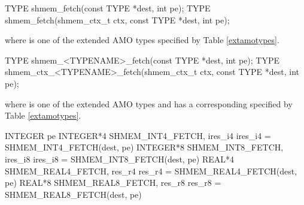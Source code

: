 
\begin{apidefinition}

\begin{C11synopsis}
TYPE shmem_fetch(const TYPE *dest, int pe);
TYPE shmem_fetch(shmem_ctx_t ctx, const TYPE *dest, int pe);
\end{C11synopsis}
where \TYPE{} is one of the extended \ac{AMO} types specified by Table \ref{extamotypes}.

\begin{Csynopsis}
TYPE shmem_<TYPENAME>_fetch(const TYPE *dest, int pe);
TYPE shmem_ctx_<TYPENAME>_fetch(shmem_ctx_t ctx, const TYPE *dest, int pe);
\end{Csynopsis}
where \TYPE{} is one of the extended \ac{AMO} types and has a corresponding \TYPENAME{} specified by Table \ref{extamotypes}.

\begin{Fsynopsis}
INTEGER pe
INTEGER*4 SHMEM_INT4_FETCH, ires_i4
ires_i4 = SHMEM_INT4_FETCH(dest, pe)
INTEGER*8 SHMEM_INT8_FETCH, ires_i8
ires_i8 = SHMEM_INT8_FETCH(dest, pe)
REAL*4 SHMEM_REAL4_FETCH, res_r4
res_r4 = SHMEM_REAL4_FETCH(dest, pe)
REAL*8 SHMEM_REAL8_FETCH, res_r8
res_r8 = SHMEM_REAL8_FETCH(dest, pe)
\end{Fsynopsis}

\begin{apiarguments}


\end{apiarguments}




\end{apidefinition}
